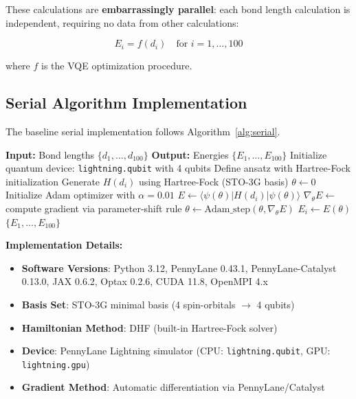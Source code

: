 \documentclass[11pt]{article}
\begin{document}
These calculations are \textbf{embarrassingly parallel}: each bond length calculation is independent, requiring no data from other calculations:

\begin{equation}
    E_i = f(d_i) \quad \text{for } i = 1, \ldots, 100
\end{equation}

where $f$ is the VQE optimization procedure.

\subsection{Serial Algorithm Implementation}

The baseline serial implementation follows Algorithm~\ref{alg:serial}.

\begin{algorithm}
    \caption{Serial VQE for H$_2$ Potential Energy Surface}
    \label{alg:serial}
    \begin{algorithmic}[1]
        \State \textbf{Input:} Bond lengths $\{d_1, \ldots, d_{100}\}$
        \State \textbf{Output:} Energies $\{E_1, \ldots, E_{100}\}$
        \State
        \State Initialize quantum device: \texttt{lightning.qubit} with 4 qubits
        \State Define ansatz with Hartree-Fock initialization
        \State
        \State Generate $H(d_i)$ using Hartree-Fock (STO-3G basis)
        \State $\theta \gets 0$
        \State Initialize Adam optimizer with $\alpha = 0.01$
        \State $E \gets \langle \psi(\theta) | H(d_i) | \psi(\theta) \rangle$ 
        \State $\nabla_\theta E \gets$ compute gradient via parameter-shift rule
        \State $\theta \gets \text{Adam\_step}(\theta, \nabla_\theta E)$
        \EndFor
        \State $E_i \gets E(\theta)$ 
        \EndFor
        \State \Return $\{E_1, \ldots, E_{100}\}$
    \end{algorithmic}
\end{algorithm}

\textbf{Implementation Details:}
\begin{itemize}
    \item \textbf{Software Versions}: Python 3.12, PennyLane 0.43.1, PennyLane-Catalyst 0.13.0, JAX 0.6.2, Optax 0.2.6, CUDA 11.8, OpenMPI 4.x
    \item \textbf{Basis Set}: STO-3G minimal basis (4 spin-orbitals $\rightarrow$ 4 qubits)
    \item \textbf{Hamiltonian Method}: DHF (built-in Hartree-Fock solver)
    \item \textbf{Device}: PennyLane Lightning simulator (CPU: \texttt{lightning.qubit}, GPU: \texttt{lightning.gpu})
    \item \textbf{Gradient Method}: Automatic differentiation via PennyLane/Catalyst
\end{itemize}
\end{document}
